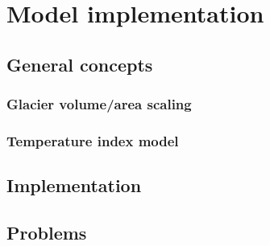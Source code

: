 \chapter{Model implementation}\label{chap:methods}
\thispagestyle{plain}

\section{General concepts} %
\label{sec:general_concepts}



    \subsection{Glacier volume/area scaling} %
    \label{sub:glacier_volume_area_scaling}
    

    \subsection{Temperature index model} %
    \label{sub:temperature_index_model}
    


\section{Implementation} %
\label{sec:implementation}




\section{Problems} %
\label{sec:problems}

